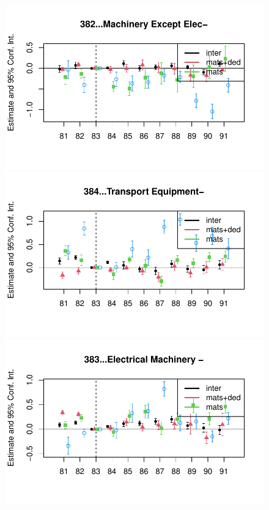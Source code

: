 \documentclass[
  12pt]{article}
\theoremstyle{definition}
\theoremstyle{remark}
\begin{document}
\begin{figure}
\begin{minipage}{\linewidth}
\includegraphics{Tax-Prod_files/figure-pdf/unnamed-chunk-12-4.pdf}

\includegraphics{Tax-Prod_files/figure-pdf/unnamed-chunk-12-5.pdf}

\includegraphics{Tax-Prod_files/figure-pdf/unnamed-chunk-12-6.pdf}


\end{minipage}
\end{figure}
\end{document}
